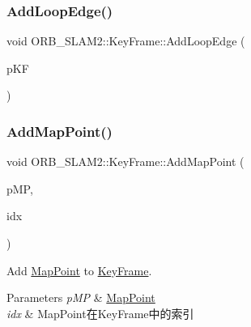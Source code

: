 \subsubsection{\texorpdfstring{Add\+Loop\+Edge()}{AddLoopEdge()}}
{\footnotesize\ttfamily void O\+R\+B\+\_\+\+S\+L\+A\+M2\+::\+Key\+Frame\+::\+Add\+Loop\+Edge (\begin{DoxyParamCaption}\item[{\mbox{\hyperlink{class_o_r_b___s_l_a_m2_1_1_key_frame}{Key\+Frame}} $\ast$}]{p\+KF }\end{DoxyParamCaption})}

\mbox{\label{class_o_r_b___s_l_a_m2_1_1_key_frame_a16ea4f0cfa1ca411bb3382107fe69d2d}} 
\subsubsection{\texorpdfstring{Add\+Map\+Point()}{AddMapPoint()}}
{\footnotesize\ttfamily void O\+R\+B\+\_\+\+S\+L\+A\+M2\+::\+Key\+Frame\+::\+Add\+Map\+Point (\begin{DoxyParamCaption}\item[{\mbox{\hyperlink{class_o_r_b___s_l_a_m2_1_1_map_point}{Map\+Point}} $\ast$}]{p\+MP,  }\item[{const size\+\_\+t \&}]{idx }\end{DoxyParamCaption})}



Add \mbox{\hyperlink{class_o_r_b___s_l_a_m2_1_1_map_point}{Map\+Point}} to \mbox{\hyperlink{class_o_r_b___s_l_a_m2_1_1_key_frame}{Key\+Frame}}. 


\begin{DoxyParams}{Parameters}
{\em p\+MP} & \mbox{\hyperlink{class_o_r_b___s_l_a_m2_1_1_map_point}{Map\+Point}} \\
\hline
{\em idx} & Map\+Point在\+Key\+Frame中的索引 \\
\hline
\end{DoxyParams}
\mbox{\label{class_o_r_b___s_l_a_m2_1_1_key_frame_a3232df2495062749da1344db3e5a487f}} 
